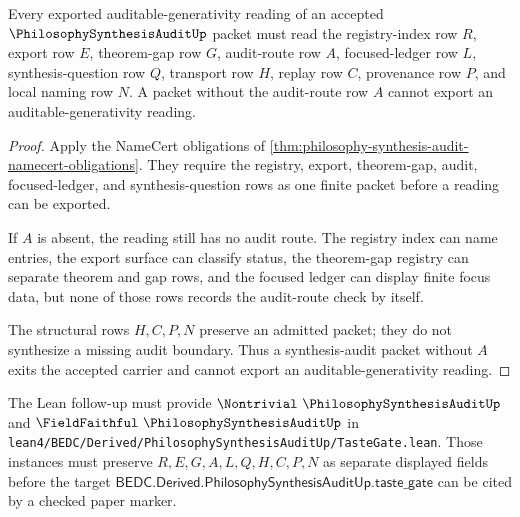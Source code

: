 \begin{theorem}
\label{thm:philosophy-synthesis-audit-nonescape}
Every exported auditable-generativity reading of an accepted $\PhilosophySynthesisAuditUp$ packet must read the registry-index row $R$, export row $E$, theorem-gap row $G$, audit-route row $A$, focused-ledger row $L$, synthesis-question row $Q$, transport row $H$, replay row $C$, provenance row $P$, and local naming row $N$. A packet without the audit-route row $A$ cannot export an auditable-generativity reading.
\end{theorem}
\begin{proof}
Apply the NameCert obligations of \autoref{thm:philosophy-synthesis-audit-namecert-obligations}. They require the registry, export, theorem-gap, audit, focused-ledger, and synthesis-question rows as one finite packet before a reading can be exported.

If $A$ is absent, the reading still has no audit route. The registry index can name entries, the export surface can classify status, the theorem-gap registry can separate theorem and gap rows, and the focused ledger can display finite focus data, but none of those rows records the audit-route check by itself.

The structural rows $H,C,P,N$ preserve an admitted packet; they do not synthesize a missing audit boundary. Thus a synthesis-audit packet without $A$ exits the accepted carrier and cannot export an auditable-generativity reading.
\end{proof}



The Lean follow-up must provide $\Nontrivial\ \PhilosophySynthesisAuditUp$ and $\FieldFaithful\ \PhilosophySynthesisAuditUp$ in \texttt{lean4/BEDC/Derived/PhilosophySynthesisAuditUp/TasteGate.lean}. Those instances must preserve $R,E,G,A,L,Q,H,C,P,N$ as separate displayed fields before the target $\mathsf{BEDC.Derived.PhilosophySynthesisAuditUp.taste\_gate}$ can be cited by a checked paper marker.

